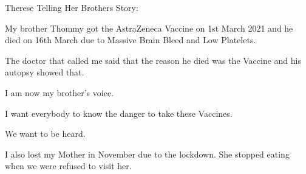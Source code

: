 Therese Telling Her Brothers Story:

My brother Thommy got the AstraZeneca Vaccine on 1st March 2021 and he died on
16th March due to Massive Brain Bleed and Low Platelets.

The doctor that called me said that the reason he died was the Vaccine and his
autopsy showed that.

I am now my brother’s voice.

I want everybody to know the danger to take these Vaccines.

We want to be heard.

I also lost my Mother in November due to the lockdown. She stopped eating when
we were refused to visit her.

